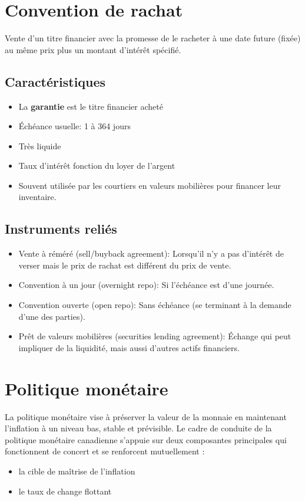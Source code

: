 \documentclass[12pt]{article}
\begin{document}
\section{Convention de rachat}
Vente d’un titre financier avec la promesse de le racheter à une date future (fixée) au même prix plus un montant d’intérêt spécifié.
\subsection{Caractéristiques}
\begin{itemize}
\item La \textbf{garantie} est le titre financier acheté
\item Échéance usuelle: 1 à 364 jours
\item Très liquide
\item Taux d’intérêt fonction du loyer de l’argent
\item Souvent utilisée par les courtiers en valeurs mobilières pour financer leur inventaire.
\end{itemize}
\subsection{Instruments reliés}
\begin{itemize}
\item Vente à réméré (sell/buyback agreement): Lorsqu’il n’y a pas d’intérêt de verser mais le prix de rachat est différent du prix de vente.
\item Convention à un jour (overnight repo): Si l’échéance est d’une journée.
\item Convention ouverte (open repo): Sans échéance (se terminant à la demande d’une des parties).
\item Prêt de valeurs mobilières (securities lending agreement): Échange qui peut impliquer de la liquidité, mais aussi d’autres actifs financiers.
\end{itemize}
\newpage
\section{Politique monétaire}
La politique monétaire vise à préserver la valeur de la monnaie en maintenant l’inflation à un niveau bas, stable et prévisible.  Le cadre de conduite de la politique monétaire canadienne s’appuie sur deux composantes principales qui fonctionnent de concert et se renforcent mutuellement : 
\begin{itemize}
\item la cible de maîtrise de l’inflation
\item le taux de change flottant
\end{itemize}
\end{document}
